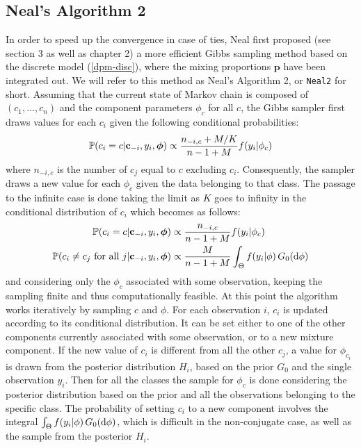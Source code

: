 \subsection{Neal's Algorithm 2}
In order to speed up the convergence in case of ties, Neal first proposed (see \cite{neal} section 3 as well as \cite{book} chapter 2) a more efficient Gibbs sampling method based on the discrete model (\ref{dpm-disc}), where the mixing proportions $\textbf{p}$ have been integrated out.
We will refer to this method as Neal's Algorithm 2, or \verb|Neal2| for short.
Assuming that the current state of Markov chain is composed of $(c_1,\dots,c_n)$  and the component parameters $\phi_c$ for all $c$, the Gibbs sampler first draws values for each $c_i$ given the following conditional probabilities:
\begin{align}
	\mathbb P(c_{i}=c | \mathbf c_{-i}, y_{i},\boldsymbol\phi) \propto \frac{n_{-i,c} + M/{K}}{n-1+M} f(y_{i}|\phi_{c}) 
\end{align}
where $n_{-i,c}$ is the number of $c_j$ equal to $c$ excluding $c_i$.
Consequently, the sampler draws a new value for each $\phi_c$ given the data belonging to that class.
The passage to the infinite case is done taking the limit as $K$ goes to infinity in the conditional distribution of $c_i$ which becomes as follows:
\begin{equation}
	\begin{aligned}
	\mathbb P(c_{i}=c | \mathbf c_{-i}, y_{i},\boldsymbol\phi) &\propto \frac{n_{-i,c} }{n-1+M} f(y_{i}|\phi_{c}) \\
	\mathbb P(c_{i}\neq c_{j} \text{ for all } j | \mathbf c_{-i}, y_{i},\boldsymbol\phi) &\propto \frac{M }{n-1+M} \int_{\Theta} f(y_{i}|\phi) \, G_0(\mathrm d\phi) 
	\end{aligned}
\end{equation}
and considering only the $\phi_c$ associated with some observation, keeping the sampling finite and thus computationally feasible.
At this point the algorithm works iteratively by sampling $c$ and $\phi$.
For each observation $i$, $c_i$ is updated according to its conditional distribution.
It can be set either to one of the other components currently associated with some observation, or to a new mixture component.
If the new value of $c_i$ is different from all the other $c_j$, a value for $\phi_{c_i}$ is drawn from the posterior distribution $H_i$, based on the prior $G_0$ and the single observation $y_i$.
Then for all the classes the  sample for $\phi_c$ is done considering the posterior distribution based on the prior and all the observations belonging to the specific class.
The probability of setting $c_i$ to a new component involves the integral $\int_{\Theta} f(y_{i}|\phi) \, G_0(\mathrm d\phi)$, which is difficult in the non-conjugate case, as well as the sample from the posterior $H_i$.

